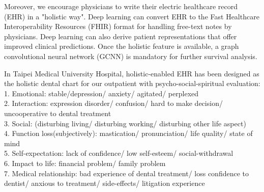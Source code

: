 \documentclass[12pt, a4paper]{article}
\begin{document}
Moreover, we encourage physicians to write their electric healthcare record (EHR) in a "holistic way".
Deep learning can convert EHR to the Fast Healthcare Interoperability Resources (FHIR) format\citep{Rajkomar2018}\citep{HealthLevelSeven2019} for handling free-text notes by physicians.
Deep learning can also derive patient representations that offer improved clinical predictions\citep{Miotto2016}.
Once the holistic feature is available, a graph convolutional neural network (GCNN) is mandatory for further survival analysis\citep{Ching2018a}.

In Taipei Medical University Hospital, holistic-enabled EHR has been designed as the holistic dental chart for our outpatient with psycho-social-spiritual evaluation\citep{Ling-ChengMong2021}:\\
1. Emotional: stable/depression/ anxiety/ agitated/ perplexed\\
2. Interaction: expression disorder/ confusion/ hard to make decision/ uncooperative to dental treatment\\
3. Social: (disturbing living/ disturbing working/ disturbing other life aspect)\\
4. Function loss(subjectively): mastication/ pronunciation/ life quality/ state of mind\\
5. Self-expectation: lack of confidence/ low self-esteem/ social-withdrawal\\
6. Impact to life: financial problem/ family problem\\
7. Medical relationship: bad experience of dental treatment/ loss confidence to dentist/ anxious to treatment/ side-effects/ litigation experience\\[0.1cm]
\end{document}
